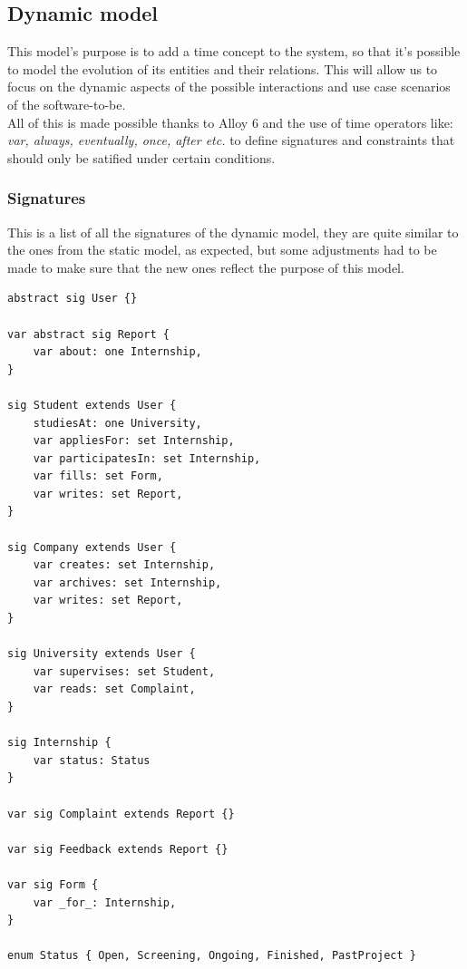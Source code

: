 \documentclass[11pt,twoside]{article}
\begin{document}
	\subsection{Dynamic model}
This model's purpose is to add a time concept to the system, so that it's possible to model the evolution of its entities and their relations. This will allow us to focus on the dynamic aspects of the possible interactions and use case scenarios of the software-to-be. \\
All of this is made possible thanks to Alloy 6 and the use of time operators like: \textit{var, always, eventually, once, after etc.} to define signatures and constraints that should only be satified under certain conditions.
	\subsubsection{Signatures}
This is a list of all the signatures of the dynamic model, they are quite similar to the ones from the static model, as expected, but some adjustments had to be made to make sure that the new ones reflect the purpose of this model.

{\small
\begin{verbatim}
abstract sig User {}

var abstract sig Report {
    var about: one Internship,
}

sig Student extends User {
	studiesAt: one University,
    var appliesFor: set Internship,
    var participatesIn: set Internship,
    var fills: set Form,
    var writes: set Report,
}

sig Company extends User {
    var creates: set Internship,
    var archives: set Internship,
    var writes: set Report,
}

sig University extends User {
    var supervises: set Student,
    var reads: set Complaint,
}

sig Internship {
    var status: Status
}

var sig Complaint extends Report {}

var sig Feedback extends Report {}

var sig Form {
    var _for_: Internship,
}

enum Status { Open, Screening, Ongoing, Finished, PastProject }

\end{verbatim}
}
\end{document}
